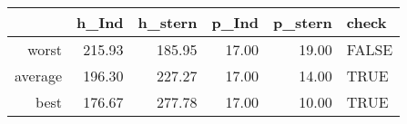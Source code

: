 \begin{tabular}{rrrrrl}
  \toprule
 & h\_Ind & h\_stern & p\_Ind & p\_stern & check \\ 
  \midrule
worst & 215.93 & 185.95 & 17.00 & 19.00 & FALSE \\ 
  average & 196.30 & 227.27 & 17.00 & 14.00 & TRUE \\ 
  best & 176.67 & 277.78 & 17.00 & 10.00 & TRUE \\ 
   \bottomrule
\end{tabular}
